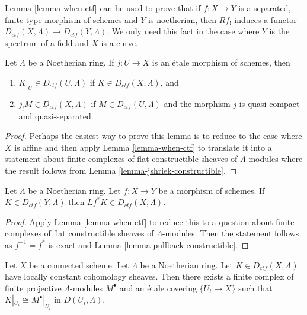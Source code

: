 \begin{remark}
\label{remark-how-used}
Lemma \ref{lemma-when-ctf}
can be used to prove that if $f: X \to Y$ is a separated, finite type
morphism of schemes and $Y$ is noetherian, then $Rf_!$ induces a functor
$D_{ctf}(X, \Lambda) \to D_{ctf}(Y, \Lambda)$. We only need this fact in
the case where $Y$ is the spectrum of a field and $X$ is a curve.
\end{remark}

\begin{lemma}
\label{lemma-restrict-and-shriek-from-etale-ctf}
Let $\Lambda$ be a Noetherian ring.
If $j : U \to X$ is an \'etale morphism of schemes, then
\begin{enumerate}
\item $K|_U \in D_{ctf}(U, \Lambda)$ if $K \in D_{ctf}(X, \Lambda)$, and
\item $j_!M \in D_{ctf}(X, \Lambda)$ if $M \in D_{ctf}(U, \Lambda)$ and
the morphism $j$ is quasi-compact and quasi-separated.
\end{enumerate}
\end{lemma}

\begin{proof}
Perhaps the easiest way to prove this lemma is to reduce to the
case where $X$ is affine and then apply Lemma \ref{lemma-when-ctf}
to translate it into a statement about finite complexes
of flat constructible sheaves of $\Lambda$-modules
where the result follows from
Lemma \ref{lemma-jshriek-constructible}.
\end{proof}

\begin{lemma}
\label{lemma-pullback-ctf}
Let $\Lambda$ be a Noetherian ring.
Let $f : X \to Y$ be a morphism of schemes. If $K \in D_{ctf}(Y, \Lambda)$
then $Lf^*K \in D_{ctf}(X, \Lambda)$.
\end{lemma}

\begin{proof}
Apply Lemma \ref{lemma-when-ctf} to reduce this to a question
about finite complexes of flat constructible sheaves of $\Lambda$-modules.
Then the statement follows as $f^{-1} = f^*$ is exact and
Lemma \ref{lemma-pullback-constructible}.
\end{proof}

\begin{lemma}
\label{lemma-connected-ctf-locally-constant}
Let $X$ be a connected scheme. Let $\Lambda$ be a Noetherian ring.
Let $K \in D_{ctf}(X, \Lambda)$ have locally constant cohomology sheaves.
Then there exists a finite complex of finite projective $\Lambda$-modules
$M^\bullet$ and an \'etale covering $\{U_i \to X\}$ such that
$K|_{U_i} \cong \underline{M^\bullet}|_{U_i}$ in $D(U_i, \Lambda)$.
\end{lemma}

